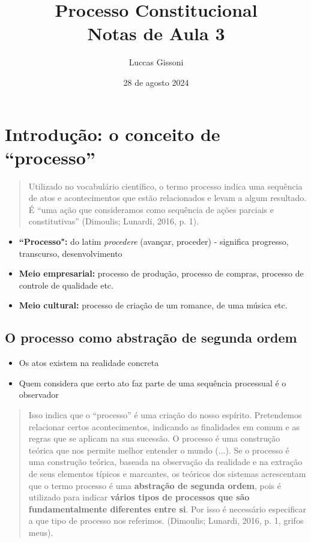 \documentclass{article}
\title{%
 Processo Constitucional \\
  \Large Notas de Aula 3 \\}
\author{Luccas Gissoni}
\date{28 de agosto 2024}
\begin{document}
\maketitle
\tableofcontents

\section{Introdução: o conceito de ``processo''}

\begin{quote}
    Utilizado no vocabulário científico, o termo processo indica uma sequência de atos e acontecimentos que estão relacionados e levam a algum resultado. É “uma ação que consideramos como sequência de ações parciais e constitutivas” (Dimoulis; Lunardi, 2016, p. 1).
\end{quote}

\begin{itemize}
    \item \textbf{``Processo":} do latim \textit{procedere} (avançar, proceder) - significa progresso, transcurso, desenvolvimento
    \item \textbf{Meio empresarial:} processo de produção, processo de compras, processo de controle de qualidade etc.
    \item \textbf{Meio cultural:} processo de criação de um romance, de uma música etc.
\end{itemize}

\subsection{O processo como abstração de segunda ordem}

\begin{itemize}
    \item Os atos existem na realidade concreta
    \item Quem considera que certo ato faz parte de uma sequência processual é o observador
\end{itemize}

\begin{quote}
    Isso indica que o “processo” é uma criação do nosso espírito. Pretendemos relacionar certos acontecimentos, indicando as finalidades em comum e as regras que se aplicam na sua sucessão. O processo é uma construção teórica que nos permite melhor entender o mundo (...). Se o processo é uma construção teórica, baseada na observação da realidade e na extração de seus elementos típicos e marcantes, os teóricos dos sistemas acrescentam que o termo processo é uma \textbf{abstração de segunda ordem}, pois é utilizado para indicar \textbf{vários tipos de processos que são fundamentalmente diferentes entre si}. Por isso é necessário especificar a que tipo de processo nos referimos. (Dimoulis; Lunardi, 2016, p. 1, grifos meus).
\end{quote}
\end{document}
